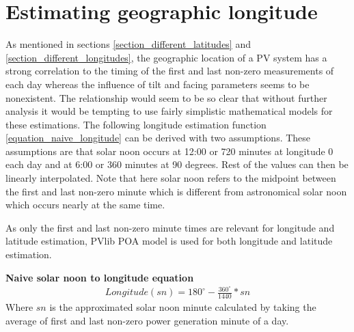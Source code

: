 
\newpage
\section{Estimating geographic longitude}
\noindent As mentioned in sections \ref{section_different_latitudes} and \ref{section_different_longitudes}, the geographic location of a PV system has a strong correlation to the timing of the first and last non-zero measurements of each day whereas the influence of tilt and facing parameters seems to be nonexistent. The relationship would seem to be so clear that without further analysis it would be tempting to use fairly simplistic mathematical models for these estimations. The following longitude estimation function \ref{equation_naive_longitude} can be derived with two assumptions. These assumptions are that solar noon occurs at 12:00 or 720 minutes at longitude 0 each day and at 6:00 or 360 minutes at 90 degrees. Rest of the values can then be linearly interpolated. Note that here solar noon refers to the midpoint between the first and last non-zero minute which is different from astronomical solar noon which occurs nearly at the same time.

As only the first and last non-zero minute times are relevant for longitude and latitude estimation, PVlib POA model is used for both longitude and latitude estimation.

\hfill \break






\noindent\textbf{Naive solar noon to longitude equation}
%
\begin{equation}
\begin{split}
\label{equation_naive_longitude}
Longitude(sn)=180^\circ-\frac{360^\circ}{1440}*sn
\end{split}
\end{equation}
Where $sn$ is the approximated solar noon minute calculated by taking the average of first and last non-zero power generation minute of a day. %

